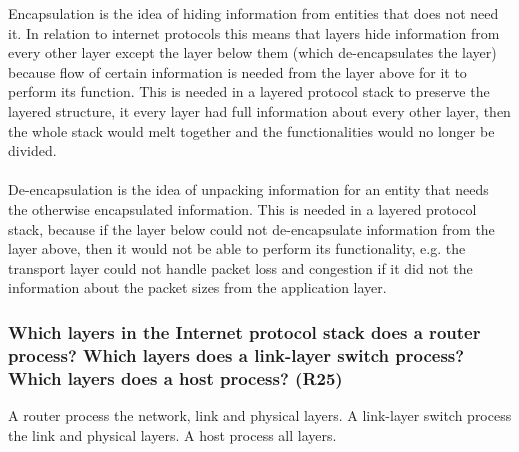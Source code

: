 Encapsulation is the idea of hiding information from entities that does not need it. In relation to internet protocols this means that layers hide information from every other layer except the layer below them (which de-encapsulates the layer) because flow of certain information is needed from the layer above for it to perform its function. This is needed in a layered protocol stack to preserve the layered structure, it every layer had full information about every other layer, then the whole stack would melt together and the functionalities would no longer be divided. \\
\\
De-encapsulation is the idea of unpacking information for an entity that needs the otherwise encapsulated information. This is needed in a layered protocol stack, because if the layer below could not de-encapsulate information from the layer above, then it would not be able to perform its functionality, e.g. the transport layer could not handle packet loss and congestion if it did not the information about the packet sizes from the application layer.


\subsubsection{Which layers in the Internet protocol stack does a router process? Which layers does a link-layer switch process? Which layers does a host process? (R25)}

A router process the network, link and physical layers. A link-layer switch process the link and physical layers. A host process all layers.
